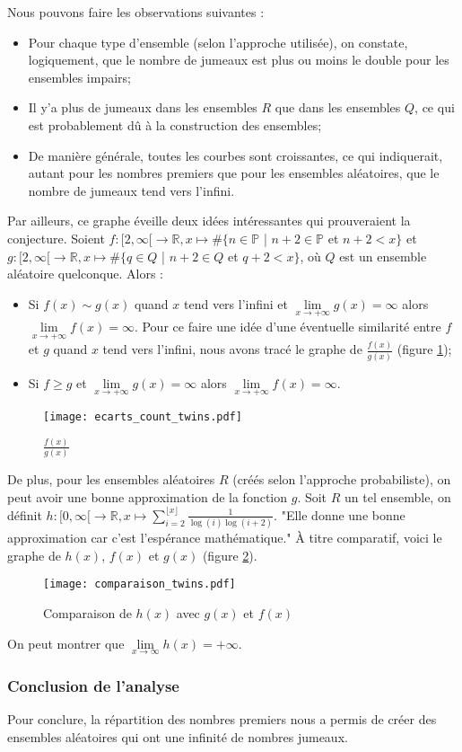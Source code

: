 \documentclass[../main.tex]{subfiles}
\begin{document}
 \newpage
 
 Nous pouvons faire les observations suivantes : 
 	\begin{itemize}
	\item Pour chaque type d'ensemble (selon l'approche utilisée), on constate, logiquement, que le nombre de jumeaux est plus ou moins le double pour les ensembles impairs;
	\item Il y'a plus de jumeaux dans les ensembles $R$ que dans les ensembles $Q$, ce qui est probablement dû à la construction des ensembles;
	\item De manière générale, toutes les courbes sont croissantes, ce qui indiquerait, autant pour les nombres premiers que pour les ensembles aléatoires, que le nombre de jumeaux tend vers l'infini. 
	\end{itemize}
	
	Par ailleurs, ce graphe éveille deux idées intéressantes qui prouveraient la conjecture. Soient $ f : [2, \infty[ \rightarrow \mathbb{R}, x \mapsto \# \{ n \in \mathbb{P}$ | $n+2 \in \mathbb{P}$ et $n+2 < x  \}$  et $ g : [2, \infty[ \rightarrow \mathbb{R}, x \mapsto \# \{ q \in Q$ | $n+2 \in Q$ et $q+2 < x  \}$, où $Q$ est un ensemble aléatoire quelconque. Alors :
\begin{itemize}
	\item Si $f(x) \sim g(x)$ quand $x$ tend vers l'infini et $\lim\limits_{x \rightarrow +\infty} g(x) = \infty$ alors $\lim\limits_{x \rightarrow +\infty} f(x) = \infty$. Pour ce faire une idée d'une éventuelle similarité entre $f$ et $g$ quand $x$ tend vers l'infini, nous avons tracé le graphe de $\frac{f(x)}{g(x)}$ (figure \ref{im:image6});
	\item Si $f \geqslant g$ et $\lim\limits_{x \rightarrow +\infty} g(x) = \infty$ alors $\lim\limits_{x \rightarrow +\infty} f(x) = \infty$.
\end{itemize}
\begin{figure}[H]
 \centering
 \texttt{[image: ecarts\_count\_twins.pdf]}
 \caption{$\frac{f(x)}{g(x)}$}
 \label{im:image6}
 \end{figure}


	De plus, pour les ensembles aléatoires $R$ (créés selon l'approche probabiliste), on peut avoir une bonne approximation de la fonction $g$. Soit $R$ un tel ensemble, on définit $ h : [0, \infty[ \rightarrow \mathbb{R}, x \mapsto \sum_{i = 2}^{\lfloor x \rfloor}  \frac{1}{\log(i) \log(i+2)}$. "Elle donne une bonne approximation car c'est l'espérance mathématique." À titre comparatif, voici le graphe de $h(x)$, $f(x)$ et $g(x)$ (figure \ref{im:image7}).
\begin{figure}[H]
 \centering
 \texttt{[image: comparaison\_twins.pdf]}
 \caption{Comparaison de $h(x)$ avec $g(x)$ et $f(x)$}
 \label{im:image7}
 \end{figure}
On peut montrer que $\lim\limits_{x \rightarrow \infty} h(x) = + \infty$. 

\subsubsection{Conclusion de l'analyse}
Pour conclure, la répartition des nombres premiers nous a permis de créer des ensembles aléatoires qui ont une infinité de nombres jumeaux. 

\clearpage
\end{document}
